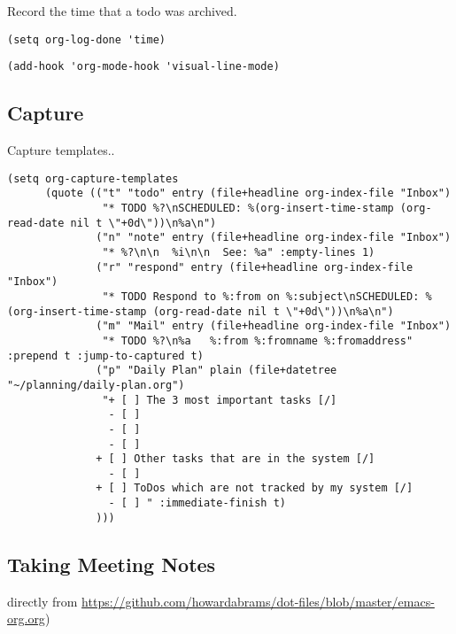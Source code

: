 \documentclass[12pt]{article}
\begin{document}
Record the time that a todo was archived.

\begin{verbatim}
(setq org-log-done 'time)
\end{verbatim}

\begin{verbatim}
(add-hook 'org-mode-hook 'visual-line-mode)
\end{verbatim}

\subsection{Capture}
\label{sec:org64ed8c7}
Capture templates..
\begin{verbatim}
(setq org-capture-templates
      (quote (("t" "todo" entry (file+headline org-index-file "Inbox")
               "* TODO %?\nSCHEDULED: %(org-insert-time-stamp (org-read-date nil t \"+0d\"))\n%a\n")
              ("n" "note" entry (file+headline org-index-file "Inbox")
               "* %?\n\n  %i\n\n  See: %a" :empty-lines 1)
              ("r" "respond" entry (file+headline org-index-file "Inbox")
               "* TODO Respond to %:from on %:subject\nSCHEDULED: %(org-insert-time-stamp (org-read-date nil t \"+0d\"))\n%a\n")
              ("m" "Mail" entry (file+headline org-index-file "Inbox")
               "* TODO %?\n%a   %:from %:fromname %:fromaddress" :prepend t :jump-to-captured t)
              ("p" "Daily Plan" plain (file+datetree "~/planning/daily-plan.org")
               "+ [ ] The 3 most important tasks [/]
                - [ ] 
                - [ ] 
                - [ ] 
              + [ ] Other tasks that are in the system [/]
                - [ ] 
              + [ ] ToDos which are not tracked by my system [/]
                - [ ] " :immediate-finish t)
              )))
\end{verbatim}

\subsection{Taking Meeting Notes}
\label{sec:org77861e5}

directly from \url{https://github.com/howardabrams/dot-files/blob/master/emacs-org.org})
\end{document}
